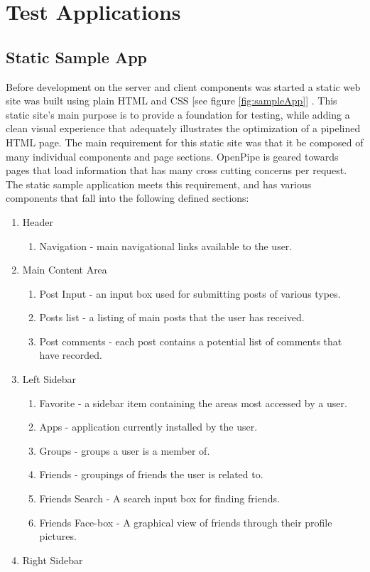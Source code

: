 \documentclass[12pt]{report}
\begin{document}

\chapter{Test Applications}

\section{Static Sample App}
Before development on the server and client components was started a static web site was built using plain HTML and CSS [see figure \ref{fig:sampleApp}] . This static site’s main purpose is to provide a foundation for testing, while adding a clean visual experience that adequately illustrates the optimization of a pipelined HTML page. The main requirement for this static site was that it be composed of many individual components and page sections. OpenPipe is geared towards pages that load information that has many cross cutting concerns per request. The static sample application meets this requirement, and has various components that fall into the following defined sections:

\begin{enumerate}
  \item Header
	\begin{enumerate}
		\item Navigation - main navigational links available to the user.
	\end{enumerate}
  \item Main Content Area
	\begin{enumerate}
		\item Post Input - an input box used for submitting posts of various types.
		\item Posts list - a listing of main posts that the user has received.
		\item Post comments - each post contains a potential list of comments that have recorded.
	\end{enumerate}
  \item Left Sidebar
	\begin{enumerate}
		\item Favorite - a sidebar item containing the areas most accessed by a user.
		\item Apps - application currently installed by the user.
		\item Groups - groups a user is a member of.
		\item Friends - groupings of friends the user is related to.
		\item Friends Search - A search input box for finding friends.
		\item Friends Face-box - A graphical view of friends through their profile pictures.
	\end{enumerate}
  \item Right Sidebar
\end{enumerate}
\end{document}
